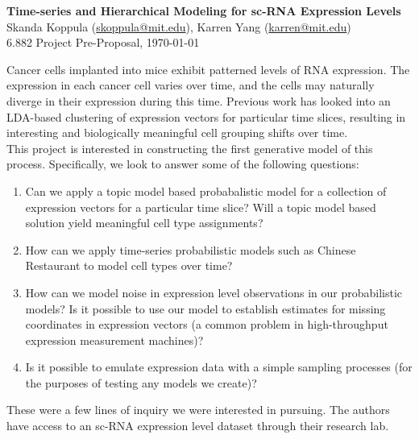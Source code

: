 \documentclass[11pt]{article}
\begin{document}
\begin{centering}
\Large
    \textbf{Time-series and Hierarchical Modeling for sc-RNA Expression Levels}  \\
    \vspace{2mm}
    \normalsize
    Skanda Koppula (\url{skoppula@mit.edu}), Karren Yang (\url{karren@mit.edu}) \\
    \vspace{2mm}
    \normalsize
    6.882 Project Pre-Proposal, \today \\
\end{centering}
\vspace{5mm}

Cancer cells implanted into mice exhibit patterned levels of RNA expression. The expression in each cancer cell varies over time, and the cells may naturally diverge in their expression during this time. Previous work has looked into an LDA-based clustering of expression vectors for particular time slices, resulting in interesting and biologically meaningful cell grouping shifts over time. \\

This project is interested in constructing the first generative model of this process. Specifically, we look to answer some of the following questions: 
\begin{enumerate}
\item Can we apply a topic model based probabalistic model for a collection of expression vectors for a particular time slice? Will a topic model based solution yield meaningful cell type assignments?
\item How can we apply time-series probabilistic models such as Chinese Restaurant to model cell types over time?
\item How can we model noise in expression level observations in our probabilistic models? Is it possible to use our model to establish estimates for missing coordinates in expression vectors (a common problem in high-throughput expression measurement machines)?
\item Is it possible to emulate expression data with a simple sampling processes (for the purposes of testing any models we create)?
\end{enumerate}
These were a few lines of inquiry we were interested in pursuing. The authors have access to an sc-RNA expression level dataset through their research lab.
\end{document}

